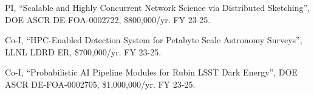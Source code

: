 \begin{innerlist}

\item PI,
	``Scalable and Highly Concurrent Network Science via Distributed Sketching'',
	DOE ASCR DE-FOA-0002722,
	\$800,000/yr.
	FY 23-25.

\item Co-I,
	``HPC-Enabled Detection System for Petabyte Scale Astronomy Surveys'',
	LLNL LDRD ER,
	\$700,000/yr.
	FY 23-25.

\item Co-I,
	``Probabilistic AI Pipeline Modules for Rubin LSST Dark Energy'',
	DOE ASCR DE-FOA-0002705,
	\$1,000,000/yr.
	FY 23-25.

\end{innerlist}
